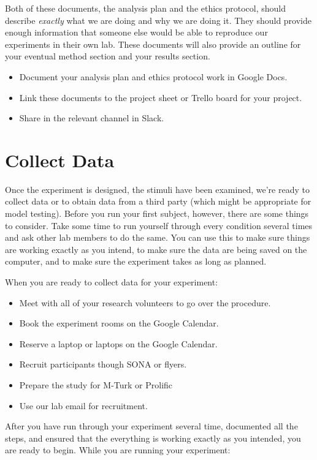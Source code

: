 \documentclass{article}
\begin{document}
Both of these documents, the analysis plan and the ethics protocol, should describe \textit{exactly} what we are doing and why we are doing it. They should provide enough information that someone else would be able to reproduce our experiments in their own lab. These documents will also provide an outline for your eventual method section and your results section.

\begin{itemize}
\item Document your analysis plan and ethics protocol work in Google Docs. 
\item Link these documents to the project sheet or Trello board for your project.
\item Share in the relevant channel in Slack.
\end{itemize}



\section{Collect Data}
Once the experiment is designed, the stimuli have been examined, we're ready to collect data or to obtain data from a third party (which might be appropriate for model testing). Before you run your first subject, however, there are some things to consider. Take some time to run yourself through every condition several times and ask other lab members to do the same. You can use this to make sure things are working exactly as you intend, to make sure the data are being saved on the computer, and to make sure the experiment takes as long as planned.

When you are ready to collect data for your experiment: 

\begin{itemize}
\item Meet with all of your research volunteers to go over the procedure. 
\item Book the experiment rooms on the Google Calendar. 
\item Reserve a laptop or laptops on the Google Calendar. 
\item Recruit participants though SONA or flyers.
\item Prepare the study for M-Turk or Prolific
\item Use our lab email for recruitment. 
\end{itemize}

After you have run through your experiment several time, documented all the steps, and ensured that the everything is working exactly as you intended, you are ready to begin. While you are running your experiment:
\end{document}
